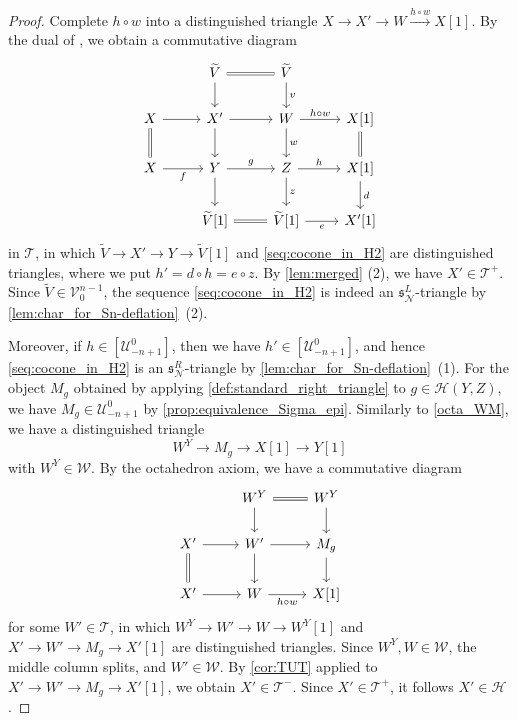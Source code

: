 \documentclass[a4paper,reqno,10pt]{amsart}
\DeclareRobustCommand{\darkblueedit}[1]{#1}
\theoremstyle{definition}
\theoremstyle{definition}
\theoremstyle{definition}
\theoremstyle{definition}
\theoremstyle{plain}
\newcommand{\wtil}[1]{\widetilde{#1}}
\newcommand{\fs}{\mathfrak{s}}
\newcommand{\CH}{\mathcal{H}}
\newcommand{\CN}{\mathcal{N}}
\newcommand{\CT}{\mathcal{T}}
\newcommand{\CU}{\mathcal{U}}
\newcommand{\CV}{\mathcal{V}}
\newcommand{\CW}{\mathcal{W}}
\begin{document}
\begin{proof}
Complete $h\circ w$ into a distinguished triangle
$X\to X'\to W\xrightarrow{h\circ w}X[1]$.
By the dual of \cite[Proposition~1.4.6]{Nee01}, we obtain a commutative diagram
\begin{equation*}
\begin{tikzcd}
&\wtil{V}\arrow[equal]{r}\arrow{d}&\wtil{V}\arrow{d}{v} &{}
\\
X\arrow{r}\arrow[equal]{d}&X'\arrow{r}\arrow{d}&W\arrow{d}{w}\arrow{r}{h\circ w} &X[1]\arrow[equal]{d}
\\
X\arrow{r}[swap]{f}&Y\arrow{r}{g}\arrow{d}{}&Z\arrow{d}{z}%
\arrow{r}{h} &X[1]\arrow{d}{d}
\\
&\wtil{V}[1]\arrow[equal]{r}&\wtil{V}[1]
\arrow{r}[swap]{e} &X'[1]
\end{tikzcd}
\end{equation*}
in $\CT$, in which $\widetilde{V}\to X'\to Y\to\widetilde{V}[1]$ and %
\eqref{seq:cocone_in_H2} are distinguished triangles, where we put $h'=d\circ h=e\circ z$.
By \cref{lem:merged} {\rm (2)}, \darkblueedit{we have} $X'\in\CT^+$.
Since $\wtil{V}\in\CV_0^{n-1}$, the sequence \eqref{seq:cocone_in_H2} is indeed an $\fs_\CN^L$-triangle by \cref{lem:char_for_Sn-deflation}~{\rm (2)}.


Moreover, if $h\in[\CU_{-n+1}^0]$, then we have $h'\in[\CU_{-n+1}^0]$, and hence \eqref{seq:cocone_in_H2} is an $\fs_\CN^R$-triangle by \cref{lem:char_for_Sn-deflation}~{\rm (1)}.
\color{blue}
For the object $M_g$ obtained by applying \cref{def:standard_right_triangle} to $g\in\CH(Y,Z)$, we have $M_g\in\CU_{-n+1}^0$ by \cref{prop:equivalence_Sigma_epi}.
Similarly to \eqref{octa_WM}, we have a distinguished triangle
\[ W^Y\to M_g\to X[1]\to Y[1]\]
with $W^Y\in\CW$.
By the octahedron axiom, we have a commutative diagram
\[
\begin{tikzcd}
{} & W^Y\arrow{d}\arrow[equal]{r} & W^Y\arrow{d} 
\\
X'\arrow{r}{}\arrow[equal]{d} & W'\arrow{d}[swap]{}\arrow{r} & M_g\arrow{d}{}
\\
X'\arrow{r} & W\arrow{r}[swap]{h\circ w} & X[1] %
\end{tikzcd}
\]
for some $W'\in\CT$, 
in which 
$W^Y\to W'\to W\to W^Y[1]$ and $X'\to W'\to M_g\to X'[1]$ are distinguished triangles.
Since $W^Y,W\in\CW$, the middle column splits, and $W'\in\CW$.
By \cref{cor:TUT} applied to $X'\to W'\to M_g\to X'[1]$, we obtain $X'\in\CT^-$.
Since $X'\in\CT^+$, it follows $X'\in\CH$.
\end{proof}
\end{document}
